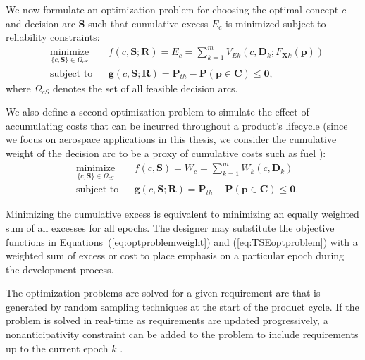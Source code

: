 We now formulate an optimization problem for choosing the optimal concept $c$ and decision arc $\mathbf{S}$ such that cumulative excess $E_c$ is minimized subject to reliability constraints:
%
\begin{equation}
	\label{eq:TSEoptproblem}
	\begin{aligned}
		& \underset{\{c,\mathbf{S}\}\in\Omega_{cS}}{\text{minimize}}
		& & {f}(c,\mathbf{S};\mathbf{R}) = E_c = \sum\limits_{k=1}^{m} V_{Ek}(c,\mathbf{D}_k;F_{\mathbf{X}k}(\mathbf{p}))\\
		& \text{subject to}
		& & \mathbf{g}(c,\mathbf{S};\mathbf{R}) = \mathbf{P}_{th} - \mathbf{P}(\mathbf{p} \in \mathbf{C}) \le \mathbf{0}, 
	\end{aligned}
\end{equation}
%
where $\Omega_{cS}$ denotes the set of all feasible decision arcs.

We also define a second optimization problem to simulate the effect of accumulating costs that can be incurred throughout a product's lifecycle (since we focus on aerospace applications in this thesis, we consider the cumulative weight of the decision arc to be a proxy of cumulative costs such as fuel \cite{Thomsen2016}):
\begin{equation}
	\label{eq:optproblemweight}
	\begin{aligned}
		& \underset{\{c,\mathbf{S}\}\in\Omega_{cS}}{\text{minimize}}
		& & {f}(c,\mathbf{S}) = W_c = \sum\limits_{k=1}^{m} W_{k}(c,\mathbf{D}_k)\\
		& \text{subject to}
		& & \mathbf{g}(c,\mathbf{S};\mathbf{R}) = \mathbf{P}_{th} - \mathbf{P}(\mathbf{p} \in \mathbf{C}) \le \mathbf{0}.
	\end{aligned}
\end{equation}

{\color{red} Minimizing the cumulative excess is equivalent to minimizing an equally weighted sum of all excesses for all epochs. The designer may substitute the objective functions in Equations~(\ref{eq:optproblemweight}) and (\ref{eq:TSEoptproblem}) with a weighted sum of excess or cost to place emphasis on a particular epoch during the development process. 

The optimization problems are solved for a given requirement arc that is generated by random sampling techniques at the start of the product cycle. If the problem is solved in real-time as requirements are updated progressively, a nonanticipativity constraint can be added to the problem to include requirements up to the current epoch $k$ \cite{Cardin2017}.}

